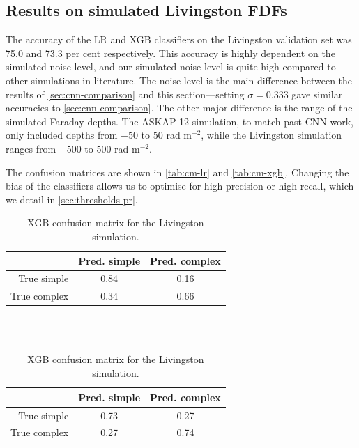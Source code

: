   \subsection{Results on simulated Livingston FDFs}
  \label{sec:faraday-results-simulated}

    The accuracy of the LR and XGB classifiers on the Livingston validation set was 75.0 and 73.3 per cent respectively. This accuracy is highly dependent on the simulated noise level, and our simulated noise level is quite high compared to other simulations in literature. The noise level is the main difference between the results of \autoref{sec:cnn-comparison} and this section---setting $\sigma=0.333$ gave similar accuracies to \autoref{sec:cnn-comparison}. The other major difference is the range of the simulated Faraday depths. The ASKAP-12 simulation, to match past CNN work, only included depths from $-50$ to $50$ rad m$^{-2}$, while the Livingston simulation ranges from $-500$ to $500$ rad m$^{-2}$.

    The confusion matrices are shown in \autoref{tab:cm-lr} and \autoref{tab:cm-xgb}. Changing the bias of the classifiers allows us to optimise for high precision or high recall, which we detail in \autoref{sec:thresholds-pr}.

    \begin{table}
      \caption{\label{tab:faraday-cm-lr} Logistic regression confusion matrix for the Livingston simulation.}
      \begin{tabular}{r|cc}
        \hline\hline
        & Pred. simple & Pred. complex \\\hline
        True simple & 0.84 & 0.16 \\
        True complex & 0.34 & 0.66 \\
        \hline\hline
      \end{tabular}\\
      \\
      \caption{\label{tab:faraday-cm-xgb} XGB confusion matrix for the Livingston simulation.}
      \begin{tabular}{r|cc}
        \hline\hline
        & Pred. simple & Pred. complex \\\hline
        True simple & 0.73 & 0.27 \\
        True complex & 0.27 & 0.74 \\
        \hline\hline
      \end{tabular}
    \end{table}

